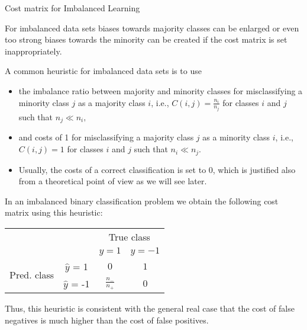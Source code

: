 \begin{vbframe}{Cost matrix for Imbalanced Learning}
	\footnotesize{
		\begin{itemize}
%			
			\item For imbalanced data sets biases towards majority classes can be enlarged or even too strong biases towards the minority can be created if the cost matrix is set inappropriately.
%			 
			\item A common heuristic for imbalanced data sets is to use 
%			
			\begin{itemize}
%				
				\footnotesize \item the imbalance ratio between majority and minority classes for misclassifying a minority class $j$ as a majority class $i$, i.e., $C(i,j) = \frac{n_i}{n_j}$ for classes $i$ and $j$ such that $n_j  \ll n_i,$  
%				
				\item and costs of 1 for misclassifying a majority class $j$ as a minority class $i$, i.e., $C(i,j) = 1$ for classes $i$ and $j$ such that $n_i \ll n_j.$ 
%				
				\item Usually, the costs of a correct classification is set to 0, which is justified also from a theoretical point of view as we will see later.
%				
			\end{itemize}
%
		\begin{minipage}{0.45\textwidth}    
					\item In an imbalanced binary classification problem we obtain the following cost matrix using this heuristic:
		\end{minipage}
%		
		\begin{minipage}{0.35\textwidth}    
						\hfill		
				\begin{tabular}{cc|cc}
					& &\multicolumn{2}{c}{True class} \\
					& & $y=1$ & $y=-1$  \\
					\hline
					\multirow{2}{*}{\parbox{0.3cm}{Pred.  class}}& $\hat y$ = 1     & $0$                & $ 1 $\\
					& $\hat y$ = -1 & $ \frac{n_-}{n_+} $              &  $0$   \\
				\end{tabular}
		\end{minipage}
	\item Thus, this heuristic is consistent with the general real case that the cost of false negatives is much higher than the cost of false positives.	
%	
%	
	\end{itemize}
		
	}
\end{vbframe}


